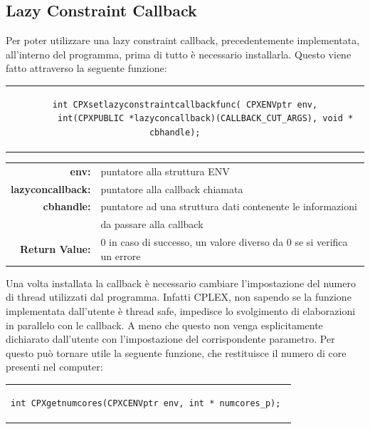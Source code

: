 \subsection{Lazy Constraint Callback}
Per poter utilizzare una lazy constraint callback, precedentemente implementata, all'interno del programma, prima di tutto è necessario installarla. Questo viene fatto attraverso la seguente funzione:
\begin{center}
\begin{tabular}{c}
\begin{lstlisting}[linewidth=385pt, basicstyle=\footnotesize\sffamily,] 
int CPXsetlazyconstraintcallbackfunc( CPXENVptr env,
		int(CPXPUBLIC *lazyconcallback)(CALLBACK_CUT_ARGS), void * cbhandle);    
\end{lstlisting}
\end{tabular}
\end{center}
\begin{table}[h]
\centering
\begin{tabular}{rl}
\textbf{env:} & {puntatore alla struttura ENV}\\
\textbf{lazyconcallback:} & {puntatore alla callback chiamata}\\
\textbf{cbhandle:} & {puntatore ad una struttura dati contenente le informazioni}\\
& {da passare alla callback}\\
\textbf{Return Value:} & {0 in caso di successo, un valore diverso da 0 se si verifica un errore}\\
\end{tabular}
\end{table}
Una volta installata la callback è necessario cambiare l'impostazione del numero di thread utilizzati dal programma. Infatti CPLEX, non sapendo se la funzione implementata dall'utente è thread safe, impedisce lo svolgimento di elaborazioni in parallelo con le callback. A meno che questo non venga esplicitamente dichiarato dall'utente con l'impostazione del corrispondente parametro.
Per questo può tornare utile la seguente funzione, che restituisce il numero di core presenti nel computer:\\
\begin{center}
\begin{tabular}{c}
\begin{lstlisting}[linewidth=280pt, basicstyle=\footnotesize\sffamily,]
int CPXgetnumcores(CPXCENVptr env, int * numcores_p); 
\end{lstlisting}
\end{tabular}
\end{center}
